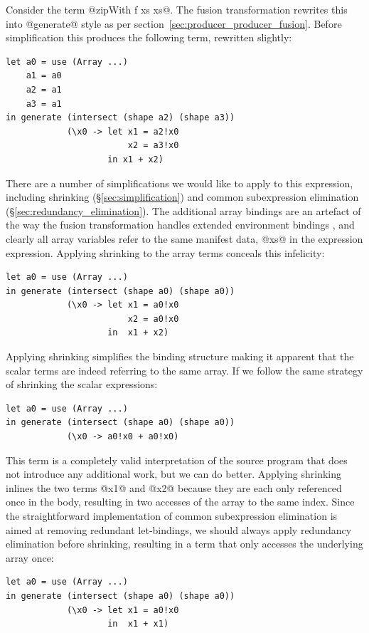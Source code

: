 Consider the term @zipWith f xs xs@. The fusion transformation rewrites
this into @generate@ style as per
section~\ref{sec:producer_producer_fusion}. Before simplification this produces
the following term, rewritten slightly: 
%
\begin{lstlisting}[style=haskell]
let a0 = use (Array ...)
    a1 = a0
    a2 = a1
    a3 = a1
in generate (intersect (shape a2) (shape a3))
            (\x0 -> let x1 = a2!x0
                        x2 = a3!x0
                    in x1 + x2)
\end{lstlisting}
%
There are a number of simplifications we would like to apply to this expression,
including shrinking (\S\ref{sec:simplification}) and common subexpression
elimination (\S\ref{sec:redundancy_elimination}). The additional array bindings
are an artefact of the way the fusion transformation handles extended
environment bindings ,
and clearly all array variables refer to the same manifest data, @xs@ in
the expression expression. Applying shrinking to the array terms conceals this
infelicity:
%
\begin{lstlisting}[style=haskell]
let a0 = use (Array ...)
in generate (intersect (shape a0) (shape a0))
            (\x0 -> let x1 = a0!x0
                        x2 = a0!x0
                    in  x1 + x2)
\end{lstlisting}
%
Applying shrinking simplifies the binding structure making it apparent that the
scalar terms are indeed referring to the same array. If we follow the same
strategy of shrinking the scalar expressions:
%
\begin{lstlisting}[style=haskell]
let a0 = use (Array ...)
in generate (intersect (shape a0) (shape a0))
            (\x0 -> a0!x0 + a0!x0)
\end{lstlisting}
%
This term is a completely valid interpretation of the source program that does
not introduce any additional work, but we can do better. Applying shrinking
inlines the two terms @x1@ and @x2@ because they are each only
referenced once in the body, resulting in two accesses of the array to the same
index. Since the straightforward implementation of common subexpression
elimination is aimed at removing redundant let-bindings, we should always apply
redundancy elimination before shrinking, resulting in a term that only accesses
the underlying array once:
%
\begin{lstlisting}[style=haskell]
let a0 = use (Array ...)
in generate (intersect (shape a0) (shape a0))
            (\x0 -> let x1 = a0!x0
                    in  x1 + x1)
\end{lstlisting}

